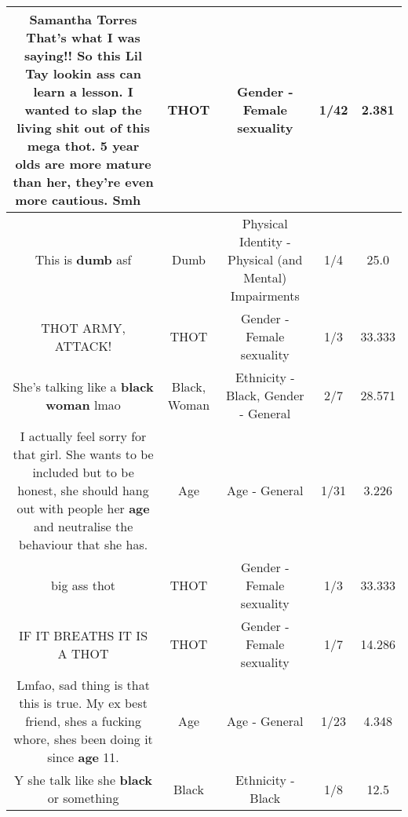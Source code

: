 \documentclass[11pt]{article}
\newlength\mylength
\begin{document}
\begin{center}
\begin{longtable}{|C{.65\mylength}|C{.30\mylength}|C{.12\mylength}|C{.12\mylength}|C{.12\mylength}|}
  \small Samantha Torres That's what I was saying!! So this Lil Tay lookin ass can learn a lesson. I wanted to slap the living shit out of this mega \textbf{thot}. 5 year olds are more mature than her, they're even more cautious. Smh🤦🏻‍♀️\normalsize   & THOT & Gender - Female sexuality & 1/42 & 2.381 \\  \hline
  \small This is \textbf{dumb} asf\normalsize   & Dumb & Physical Identity - Physical (and Mental) Impairments & 1/4 & 25.0 \\  \hline
  \small THOT ARMY, ATTACK!\normalsize   & THOT & Gender - Female sexuality & 1/3 & 33.333 \\  \hline
  \small She's talking like a \textbf{black} \textbf{woman} lmao\normalsize   & Black, Woman & Ethnicity - Black, Gender - General & 2/7 & 28.571 \\  \hline
  \small I actually feel sorry for that girl. She wants to be included but to be honest, she should hang out with people her \textbf{age} and neutralise the behaviour that she has.\normalsize   & Age & Age - General & 1/31 & 3.226 \\  \hline
  \small big ass thot\normalsize   & THOT & Gender - Female sexuality & 1/3 & 33.333 \\  \hline
  \small IF IT BREATHS  IT IS  A  THOT\normalsize   & THOT & Gender - Female sexuality & 1/7 & 14.286 \\  \hline
  \small Lmfao, sad thing is that this is true. My ex best friend, shes a fucking whore, shes been doing it since \textbf{age} 11.\normalsize   & Age & Age - General & 1/23 & 4.348 \\  \hline
  \small Y she talk like she \textbf{black} or something\normalsize   & Black & Ethnicity - Black & 1/8 & 12.5 \\  \hline

\end{longtable}
\end{center}
\end{document}
